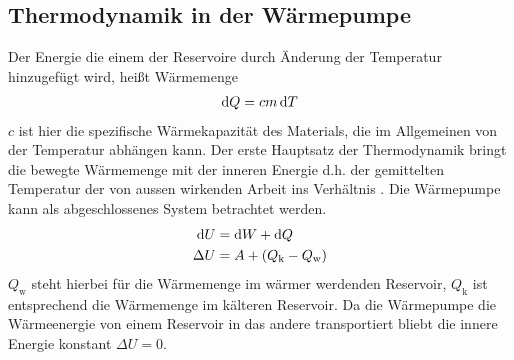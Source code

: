 \subsection{Thermodynamik in der Wärmepumpe}

Der Energie die einem der Reservoire durch Änderung der Temperatur hinzugefügt wird,
heißt Wärmemenge
\begin{align}
    \mathop{}\!\mathrm{d} Q = c m \mathop{}\!\mathrm{d} T 
    \label{eq:dQ}
\end{align} 
$ c $ ist hier die spezifische Wärmekapazität des Materials,
 die im Allgemeinen von der Temperatur abhängen kann.
Der erste Hauptsatz der Thermodynamik bringt die bewegte Wärmemenge
mit der inneren Energie d.h. der gemittelten Temperatur der von aussen wirkenden Arbeit
ins Verhältnis \cite[vgl][318]{demtroeder}. 
Die Wärmepumpe kann als abgeschlossenes System betrachtet werden. 
\begin{align}
                \mathop{}\!\mathrm{d} U &= \mathop{}\!\mathrm{d} W + \mathop{}\!\mathrm{d} Q \\
    \nonumber   \Delta U &= A + ( Q_\text{k} - Q_\text{w})
\end{align}
$Q_\text{w}$ steht hierbei für die Wärmemenge im wärmer werdenden Reservoir, $Q_\text{k}$ ist entsprechend die Wärmemenge im kälteren Reservoir.
Da die Wärmepumpe die Wärmeenergie von einem Reservoir in das andere transportiert
    bliebt die innere Energie konstant $ \Delta U = 0 $.


